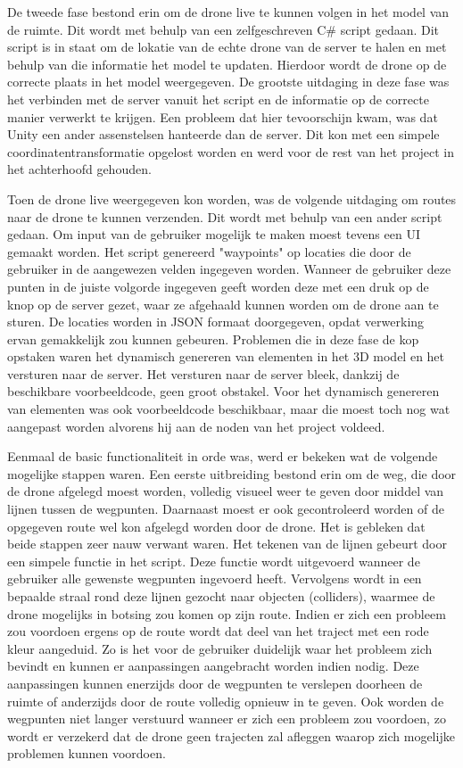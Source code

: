 De tweede fase bestond erin om de drone live te kunnen volgen in het model van de ruimte. Dit wordt met behulp van een zelfgeschreven C\# script gedaan. Dit script is in staat om de lokatie van de echte drone van de server te halen en met behulp van die informatie het model te updaten. Hierdoor wordt de drone op de correcte plaats in het model weergegeven. De grootste uitdaging in deze fase was het verbinden met de server vanuit het script en de informatie op de correcte manier verwerkt te krijgen. Een probleem dat hier tevoorschijn kwam, was dat Unity een ander assenstelsen hanteerde dan de server. Dit kon met een simpele coordinatentransformatie opgelost worden en werd voor de rest van het project in het achterhoofd gehouden.

Toen de drone live weergegeven kon worden, was de volgende uitdaging om routes naar de drone te kunnen verzenden. Dit wordt met behulp van een ander script gedaan. Om input van de gebruiker mogelijk te maken moest tevens een UI gemaakt worden. Het script genereerd "waypoints" op locaties die door de gebruiker in de aangewezen velden ingegeven worden. Wanneer de gebruiker deze punten in de juiste volgorde ingegeven geeft worden deze met een druk op de knop op de server gezet, waar ze afgehaald kunnen worden om de drone aan te sturen. De locaties worden in JSON formaat doorgegeven, opdat verwerking ervan gemakkelijk zou kunnen gebeuren. Problemen die in deze fase de kop opstaken waren het dynamisch genereren van elementen in het 3D model en het versturen naar de server. Het versturen naar de server bleek, dankzij de beschikbare voorbeeldcode, geen groot obstakel. Voor het dynamisch genereren van elementen was ook voorbeeldcode beschikbaar, maar die moest toch nog wat aangepast worden alvorens hij aan de noden van het project voldeed.

Eenmaal de basic functionaliteit in orde was, werd er bekeken wat de volgende mogelijke stappen waren. Een eerste uitbreiding bestond erin om de weg, die door de drone afgelegd moest worden, volledig visueel weer te geven door middel van lijnen tussen de wegpunten. Daarnaast moest er ook gecontroleerd worden of de opgegeven route wel kon afgelegd worden door de drone. Het is gebleken dat beide stappen zeer nauw verwant waren. Het tekenen van de lijnen gebeurt door een simpele functie in het script. Deze functie wordt uitgevoerd wanneer de gebruiker alle gewenste wegpunten ingevoerd heeft. Vervolgens wordt in een bepaalde straal rond deze lijnen gezocht naar objecten (colliders), waarmee de drone mogelijks in botsing zou komen op zijn route. Indien er zich een probleem zou voordoen ergens op de route wordt dat deel van het traject met een rode kleur aangeduid. Zo is het voor de gebruiker duidelijk waar het probleem zich bevindt en kunnen er aanpassingen aangebracht worden indien nodig. Deze aanpassingen kunnen enerzijds door de wegpunten te verslepen doorheen de ruimte of anderzijds door de route volledig opnieuw in te geven. Ook worden de wegpunten niet langer verstuurd wanneer er zich een probleem zou voordoen, zo wordt er verzekerd dat de drone geen trajecten zal afleggen waarop zich mogelijke problemen kunnen voordoen.

